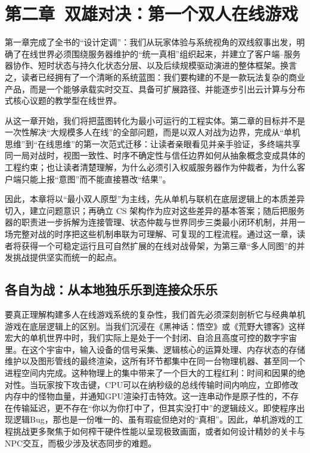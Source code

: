 \section{第二章\ 双雄对决：第一个双人在线游戏}

第一章完成了全书的“设计定调”：我们从玩家体验与系统视角的双线叙事出发，明确了在线世界必须围绕服务器维护的“统一真相”组织起来，并建立了客户端--服务器协作、短时状态与持久化状态分层、以及后续规模驱动演进的整体框架。换言之，读者已经拥有了一个清晰的系统蓝图：我们要构建的不是一款玩法复杂的商业产品，而是一个能够承载实时交互、具备可扩展路径、并能逐步引出云计算与分布式核心议题的教学型在线世界。

从这一章开始，我们将把蓝图转化为最小可运行的工程实体。第二章的目标并不是一次性解决“大规模多人在线”的全部问题，而是以双人对战为边界，完成从“单机思维”到“在线思维”的第一次范式迁移：让读者亲眼看见并亲手验证，多终端共享同一局对战时，视图一致性、时序不确定性与信任边界如何从抽象概念变成具体的工程约束；也让读者清楚理解，为什么必须引入权威服务器作为仲裁者，为什么客户端只能上报“意图”而不能直接篡改“结果”。

因此，本章将以“最小双人原型”为主线，先从单机与联机在底层逻辑上的本质差异切入，建立问题意识；再确立 CS 架构作为应对这些差异的基本答案；随后把服务器的职责进一步拆解为连接管理、状态仲裁与世界同步三类最小闭环机制，并用一场完整对战的时序把这些机制串联为可理解、可复现的工程流程。通过这一章，读者将获得一个可稳定运行且可自然扩展的在线对战骨架，为第三章“多人同图”的并发挑战提供坚实而统一的起点。


\subsection{各自为战：从本地独乐乐到连接众乐乐}

要真正理解构建多人在线游戏系统的复杂性，我们首先必须深刻剖析它与经典单机游戏在底层逻辑上的区别。当我们沉浸在《黑神话：悟空》或《荒野大镖客》这样宏大的单机世界中时，我们实际上是处于一个封闭、自洽且高度可控的数字宇宙里。在这个宇宙中，输入设备的信号采集、逻辑核心的运算处理、内存状态的存储维护以及图形管线的最终渲染，这所有环节都集中在同一台物理机器、甚至同一个进程空间内完成。这种物理上的集中带来了一个巨大的工程红利：时间和因果的绝对性。当玩家按下攻击键，CPU可以在纳秒级的总线传输时间内响应，立即修改内存中的怪物血量，并通知GPU渲染打击特效。这一连串动作是原子性的，不存在传输延迟，更不存在“你以为你打中了，但其实没打中”的逻辑歧义。即使程序出现逻辑Bug，那也是一份唯一的、虽有瑕疵但绝对的“真相”。因此，单机游戏的工程挑战更多聚焦于如何榨干硬件性能以呈现极致画面，或者如何设计精妙的关卡与NPC交互，而极少涉及状态同步的难题。

